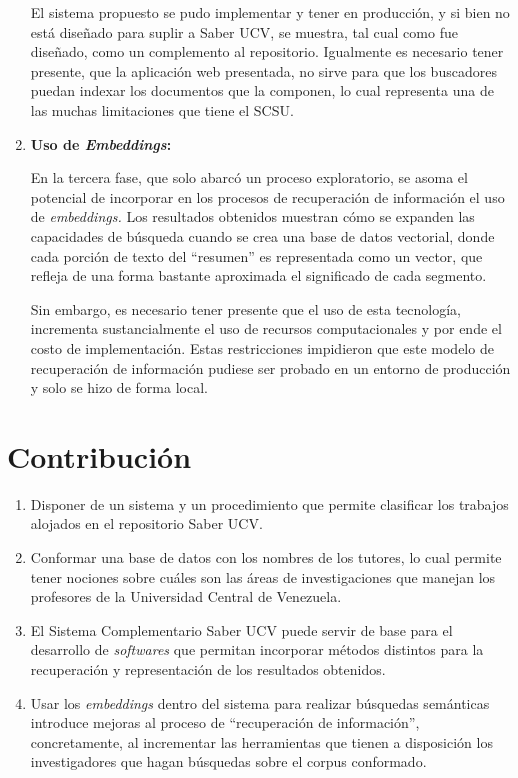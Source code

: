 \documentclass[
  12pt,
  openany]{book}
\begin{document}
\begin{enumerate}
  El sistema propuesto se pudo implementar y tener en producción, y si bien no está diseñado para suplir a Saber UCV, se muestra, tal cual como fue diseñado, como un complemento al repositorio. Igualmente es necesario tener presente, que la aplicación web presentada, no sirve para que los buscadores puedan indexar los documentos que la componen, lo cual representa una de las muchas limitaciones que tiene el SCSU.
\item
  \textbf{Uso de \emph{Embeddings}:}

  En la tercera fase, que solo abarcó un proceso exploratorio, se asoma el potencial de incorporar en los procesos de recuperación de información el uso de \emph{embeddings.} Los resultados obtenidos muestran cómo se expanden las capacidades de búsqueda cuando se crea una base de datos vectorial, donde cada porción de texto del ``resumen'' es representada como un vector, que refleja de una forma bastante aproximada el significado de cada segmento.

  Sin embargo, es necesario tener presente que el uso de esta tecnología, incrementa sustancialmente el uso de recursos computacionales y por ende el costo de implementación. Estas restricciones impidieron que este modelo de recuperación de información pudiese ser probado en un entorno de producción y solo se hizo de forma local.
\end{enumerate}

\hypertarget{conclusionescontri}{%
\section{Contribución}\label{conclusionescontri}}

\begin{enumerate}
\def\labelenumi{\arabic{enumi}.}
\item
  Disponer de un sistema y un procedimiento que permite clasificar los trabajos alojados en el repositorio Saber UCV.
\item
  Conformar una base de datos con los nombres de los tutores, lo cual permite tener nociones sobre cuáles son las áreas de investigaciones que manejan los profesores de la Universidad Central de Venezuela.
\item
  El Sistema Complementario Saber UCV puede servir de base para el desarrollo de \emph{softwares} que permitan incorporar métodos distintos para la recuperación y representación de los resultados obtenidos.
\item
  Usar los \emph{embeddings} dentro del sistema para realizar búsquedas semánticas introduce mejoras al proceso de ``recuperación de información'', concretamente, al incrementar las herramientas que tienen a disposición los investigadores que hagan búsquedas sobre el corpus conformado.
\end{enumerate}
\end{document}
